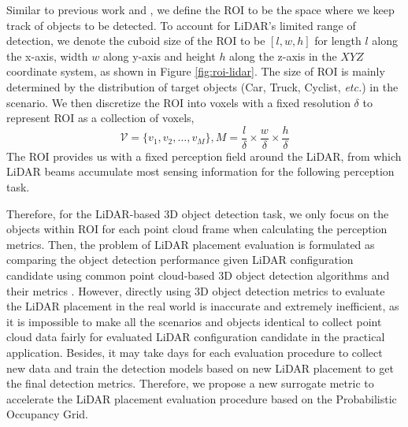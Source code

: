 \documentclass[10pt,twocolumn,letterpaper]{article}
\newcommand{\todo}[1]{\hl{[#1]}}
\begin{document}
Similar to previous work \cite{liu2019should} and \cite{mou2018optimal}, we define the ROI to be the space where we keep track of objects to be detected. To account for LiDAR's limited range of detection, we denote the cuboid size of the ROI to be $[l, w, h]$ for length $l$ along the x-axis, width $w$ along y-axis and height $h$ along the z-axis in the $XYZ$ coordinate system, as shown in Figure \ref{fig:roi-lidar}. The size of ROI is mainly determined by the distribution of target objects (Car, Truck, Cyclist, \textit{etc.}) in the scenario.
We then discretize the ROI into voxels with a fixed resolution $\delta$ to represent ROI as a collection of voxels,
\begin{equation}
\label{ROI_voxels}
\mathcal{V}=\{v_1, v_2, \dots, v_M\}, M=\frac{l}{\delta}\times\frac{w}{\delta}\times\frac{h}{\delta}
\end{equation}
 The ROI provides us with a fixed perception field around the LiDAR, from which LiDAR beams accumulate most sensing information for the following perception task.

Therefore, for the LiDAR-based 3D object detection task, we only focus on the objects within ROI for each point cloud frame when calculating the perception metrics.
Then, the problem of LiDAR placement evaluation is formulated as comparing the object detection performance given LiDAR configuration candidate using common point cloud-based 3D object detection algorithms and their metrics \cite{geiger2013vision}. However, directly using 3D object detection metrics to evaluate the LiDAR placement in the real world is inaccurate and extremely inefficient, as it is impossible to make all the scenarios and objects identical to collect point cloud data fairly for evaluated LiDAR configuration candidate in the practical application. Besides, it may take days for each evaluation procedure to collect new data and train the detection models based on new LiDAR placement to get the final detection metrics. Therefore, we propose a new surrogate metric to accelerate the LiDAR placement evaluation procedure based on the Probabilistic Occupancy Grid.
\end{document}
